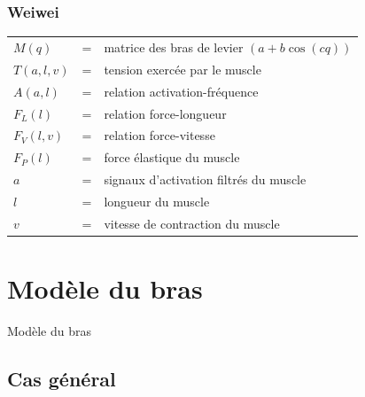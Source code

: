 \documentclass{beamer}
\begin{document}
\begin{frame}
\frametitle{Weiwei}
\begin{tabular}{lcl}
    $M(q)$  & = & matrice des bras de levier $(a + b \cos (c q))$ \\
    $T(a, l, v)$ & = & tension exercée par le muscle \\
    $A(a, l)$    & = & relation activation-fréquence \\
    $F_L(l)$     & = & relation force-longueur \\
    $F_V(l, v)$  & = & relation force-vitesse \\
    $F_P(l)$     & = & force élastique du muscle \\ %
    $a$          & = & signaux d'activation filtrés du muscle \\
    $l$          & = & longueur du muscle \\
    $v$          & = & vitesse de contraction du muscle \\
\end{tabular}
\end{frame}



\section{Modèle du bras}
\begin{frame}
\begin{center}
{\LARGE Modèle du bras}
\end{center}
\end{frame}


\subsection{Cas général}
\end{document}
